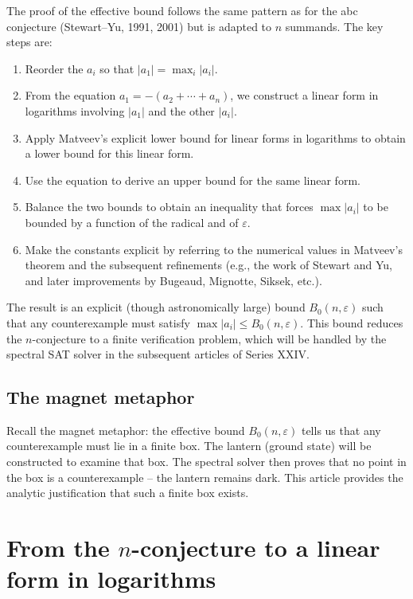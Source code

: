\documentclass[11pt,a4paper]{article}
\begin{document}
The proof of the effective bound follows the same pattern as for the abc conjecture (Stewart–Yu, 1991, 2001) but is adapted to $n$ summands. The key steps are:
\begin{enumerate}
\item Reorder the $a_i$ so that $|a_1| = \max_i |a_i|$.
\item From the equation $a_1 = -(a_2+\cdots+a_n)$, we construct a linear form in logarithms involving $|a_1|$ and the other $|a_i|$.
\item Apply Matveev's explicit lower bound for linear forms in logarithms to obtain a lower bound for this linear form.
\item Use the equation to derive an upper bound for the same linear form.
\item Balance the two bounds to obtain an inequality that forces $\max|a_i|$ to be bounded by a function of the radical and of $\varepsilon$.
\item Make the constants explicit by referring to the numerical values in Matveev's theorem and the subsequent refinements (e.g., the work of Stewart and Yu, and later improvements by Bugeaud, Mignotte, Siksek, etc.).
\end{enumerate}

The result is an explicit (though astronomically large) bound $B_0(n,\varepsilon)$ such that any counterexample must satisfy $\max|a_i| \le B_0(n,\varepsilon)$. This bound reduces the $n$-conjecture to a finite verification problem, which will be handled by the spectral SAT solver in the subsequent articles of Series XXIV.

\subsection*{The magnet metaphor}

Recall the magnet metaphor: the effective bound $B_0(n,\varepsilon)$ tells us that any counterexample must lie in a finite box. The lantern (ground state) will be constructed to examine that box. The spectral solver then proves that no point in the box is a counterexample – the lantern remains dark. This article provides the analytic justification that such a finite box exists.

\section{From the $n$-conjecture to a linear form in logarithms}
\end{document}
